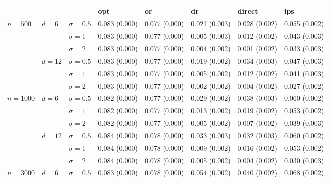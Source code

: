 \documentclass[11pt]{article} %
\theoremstyle{theorem}  %
\theoremstyle{plain}
\begin{document}
\begin{figure}[H]
\scriptsize
\centering
\begin{tabular}{llllllll}
\toprule
         &        &            &            opt &             or &             dr &         direct &            ips \\
\midrule
\multirow{6}{*}{$n=500$} & \multirow{3}{*}{$d=6$} & $\sigma=0.5$ &  0.083 (0.000) &  0.077 (0.000) &  0.021 (0.003) &  0.028 (0.002) &  0.055 (0.002) \\
         &        & $\sigma=1$ &  0.083 (0.000) &  0.077 (0.000) &  0.005 (0.003) &  0.012 (0.002) &  0.043 (0.003) \\
         &        & $\sigma=2$ &  0.083 (0.000) &  0.077 (0.000) &  0.004 (0.002) &  0.001 (0.002) &  0.033 (0.003) \\
\cline{2-8}
         & \multirow{3}{*}{$d=12$} & $\sigma=0.5$ &  0.083 (0.000) &  0.077 (0.000) &  0.019 (0.002) &  0.034 (0.003) &  0.047 (0.003) \\
         &        & $\sigma=1$ &  0.083 (0.000) &  0.077 (0.000) &  0.005 (0.002) &  0.012 (0.002) &  0.041 (0.003) \\
         &        & $\sigma=2$ &  0.083 (0.000) &  0.077 (0.000) &  0.002 (0.002) &  0.004 (0.002) &  0.027 (0.002) \\
\cline{1-8}
\cline{2-8}
\multirow{6}{*}{$n=1000$} & \multirow{3}{*}{$d=6$} & $\sigma=0.5$ &  0.082 (0.000) &  0.077 (0.000) &  0.029 (0.002) &  0.038 (0.003) &  0.060 (0.002) \\
         &        & $\sigma=1$ &  0.082 (0.000) &  0.077 (0.000) &  0.013 (0.002) &  0.019 (0.002) &  0.053 (0.002) \\
         &        & $\sigma=2$ &  0.082 (0.000) &  0.077 (0.000) &  0.005 (0.002) &  0.007 (0.002) &  0.039 (0.003) \\
\cline{2-8}
         & \multirow{3}{*}{$d=12$} & $\sigma=0.5$ &  0.084 (0.000) &  0.078 (0.000) &  0.033 (0.003) &  0.032 (0.003) &  0.060 (0.002) \\
         &        & $\sigma=1$ &  0.084 (0.000) &  0.078 (0.000) &  0.009 (0.002) &  0.016 (0.002) &  0.053 (0.002) \\
         &        & $\sigma=2$ &  0.084 (0.000) &  0.078 (0.000) &  0.005 (0.002) &  0.004 (0.002) &  0.030 (0.003) \\
\cline{1-8}
\cline{2-8}
\multirow{6}{*}{$n=3000$} & \multirow{3}{*}{$d=6$} & $\sigma=0.5$ &  0.083 (0.000) &  0.078 (0.000) &  0.054 (0.002) &  0.040 (0.002) &  0.068 (0.002) \\

\end{tabular}
\end{figure}
\end{document}
